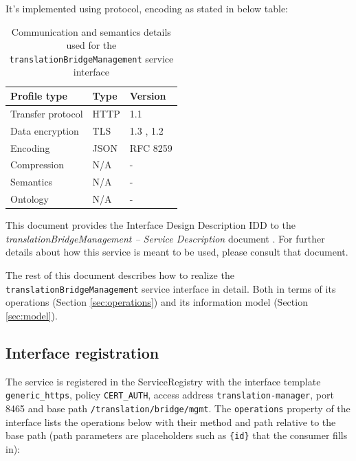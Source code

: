 \documentclass[a4paper]{arrowhead}
\begin{document}
It's implemented using protocol, encoding as stated in below table:
\begin{table}[ht!]
  \centering
  \begin{tabular}{|l|l|l|}
    \hline
    \rowcolor{gray!33} Profile type & Type & Version \\ \hline
    Transfer protocol & HTTP & 1.1 \cite{rfc9112} \\ \hline
    Data encryption & TLS & 1.3 \cite{rfc8446}, 1.2 \cite{rfc5246} \\ \hline
    Encoding & JSON & RFC 8259 \cite{rfc8259} \\ \hline
    Compression & N/A & - \\ \hline
    Semantics & N/A & - \\ \hline
    Ontology & N/A & - \\ \hline
  \end{tabular}
  \caption{Communication and semantics details used for the \texttt{translation\allowbreak{}Bridge\allowbreak{}Management} service interface}
  \label{tab:comunication_semantics_profile}
\end{table}

This document provides the Interface Design Description IDD to the \textit{translationBridgeManagement -- Service Description} document \cite{tm-translationBridgeManagement-sd}.
For further details about how this service is meant to be used, please consult that document.

The rest of this document describes how to realize the \texttt{translation\allowbreak{}Bridge\allowbreak{}Management} service
interface in detail. Both in terms of its operations (Section \ref{sec:operations}) and its information model (Section \ref{sec:model}).

\subsection{Interface registration}

The service is registered in the ServiceRegistry with the interface template \texttt{generic\_\allowbreak{}https}, policy \texttt{CERT\_\allowbreak{}AUTH}, access address \texttt{translation-\allowbreak{}manager}, port 8465 and base path \texttt{/\allowbreak{}translation/\allowbreak{}bridge/\allowbreak{}mgmt}. The \texttt{operations} property of the interface lists the operations below with their method and path relative to the base path (path parameters are placeholders such as \texttt{\{id\}} that the consumer fills in):
\end{document}
